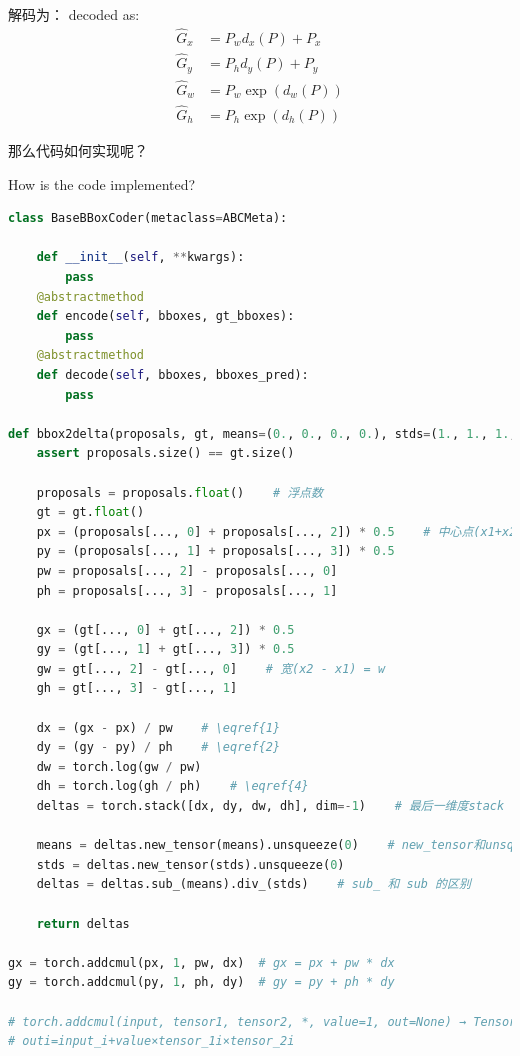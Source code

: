 \documentclass[UTF8]{ctexart}
\begin{document}
解码为：
decoded as:
$$
\begin{aligned}
	\hat{G}_{x} &=P_{w} d_{x}(P)+P_{x} \\
	\hat{G}_{y} &=P_{h} d_{y}(P)+P_{y} \\
	\hat{G}_{w} &=P_{w} \exp \left(d_{w}(P)\right) \\
	\hat{G}_{h} &=P_{h} \exp \left(d_{h}(P)\right)
\end{aligned}
$$

那么代码如何实现呢？

How is the code implemented?

\lstset{style=mystyle}
\begin{lstlisting}[language=Python]
class BaseBBoxCoder(metaclass=ABCMeta):

	def __init__(self, **kwargs):
		pass
	@abstractmethod
	def encode(self, bboxes, gt_bboxes):
		pass
	@abstractmethod
	def decode(self, bboxes, bboxes_pred):
		pass

def bbox2delta(proposals, gt, means=(0., 0., 0., 0.), stds=(1., 1., 1., 1.)):
	assert proposals.size() == gt.size()

	proposals = proposals.float()    # 浮点数
	gt = gt.float()
	px = (proposals[..., 0] + proposals[..., 2]) * 0.5    # 中心点(x1+x2)/2
	py = (proposals[..., 1] + proposals[..., 3]) * 0.5 
	pw = proposals[..., 2] - proposals[..., 0]    
	ph = proposals[..., 3] - proposals[..., 1]

	gx = (gt[..., 0] + gt[..., 2]) * 0.5    
	gy = (gt[..., 1] + gt[..., 3]) * 0.5
	gw = gt[..., 2] - gt[..., 0]    # 宽(x2 - x1) = w
	gh = gt[..., 3] - gt[..., 1]

	dx = (gx - px) / pw    # \eqref{1}
	dy = (gy - py) / ph    # \eqref{2}
	dw = torch.log(gw / pw)
	dh = torch.log(gh / ph)    # \eqref{4}
	deltas = torch.stack([dx, dy, dw, dh], dim=-1)    # 最后一维度stack

	means = deltas.new_tensor(means).unsqueeze(0)    # new_tensor和unsqueeze(扩张维度)
	stds = deltas.new_tensor(stds).unsqueeze(0)
	deltas = deltas.sub_(means).div_(stds)    # sub_ 和 sub 的区别

	return deltas

gx = torch.addcmul(px, 1, pw, dx)  # gx = px + pw * dx
gy = torch.addcmul(py, 1, ph, dy)  # gy = py + ph * dy

# torch.addcmul(input, tensor1, tensor2, *, value=1, out=None) → Tensor
# outi​=input_i​+value×tensor_1i​×tensor_2i​
\end{lstlisting}
\end{document}
